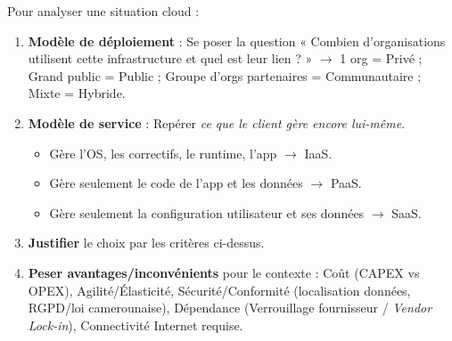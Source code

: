 \documentclass[11pt]{article}
\newcommand{\cle}[1]{{\popxbold\color{popdark}#1}}
\begin{document}
\begin{methode}
Pour analyser une situation cloud :
\begin{enumerate}
\item \textbf{Modèle de déploiement} : Se poser la question « Combien d'organisations utilisent cette infrastructure et quel est leur lien ? » $\to$ 1 org = Privé ; Grand public = Public ; Groupe d'orgs partenaires = Communautaire ; Mixte = Hybride.
\item \textbf{Modèle de service} : Repérer \emph{ce que le client gère encore lui-même}.
\begin{itemize}
\item Gère l'OS, les correctifs, le runtime, l'app $\to$ \cle{IaaS}.
\item Gère seulement le code de l'app et les données $\to$ \cle{PaaS}.
\item Gère seulement la configuration utilisateur et ses données $\to$ \cle{SaaS}.
\end{itemize}
\item \textbf{Justifier} le choix par les critères ci-dessus.
\item \textbf{Peser avantages/inconvénients} pour le contexte : Coût (CAPEX vs OPEX), Agilité/Élasticité, Sécurité/Conformité (localisation données, RGPD/loi camerounaise), Dépendance (Verrouillage fournisseur / \emph{Vendor Lock-in}), Connectivité Internet requise.
\end{enumerate}
\end{methode}
\end{document}
